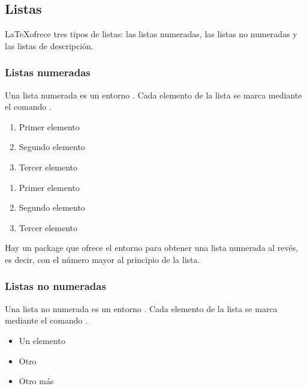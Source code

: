 \subsection{Listas}

\LaTeX ofrece tres tipos de listas: las listas numeradas, las listas no numeradas y las listas de descripción.

\subsubsection{Listas numeradas}

Una lista numerada es un entorno      .
Cada elemento de la lista se marca mediante el comando .

\begin{latexcode}
\begin{enumerate}
    \item Primer elemento
    \item Segundo elemento
    \item Tercer elemento
\end{enumerate}
\end{latexcode}

\begin{quotation*}
\begin{enumerate}
    \item Primer elemento
    \item Segundo elemento
    \item Tercer elemento
\end{enumerate}
\end{quotation*}

\begin{plusloins}
Hay un package  que ofrece el entorno  para obtener una lista numerada al revés, es decir, con el número mayor al principio de la lista.

\end{plusloins}
\subsubsection{Listas no numeradas}

Una lista no numerada es un entorno .
Cada elemento de la lista se marca mediante el comando .

\begin{latexcode}
\begin{itemize}
    \item Un elemento
    \item Otro
    \item Otro más
\end{itemize}
\end{latexcode}

